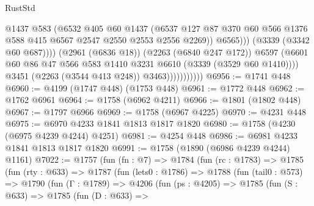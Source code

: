 \begin{lexlean}{RustStd}
\begin{coremodule}
{\begin{coremodule}
{{{{{{{{{{{{{{{                                      @1437
                                      @583
                                      (@6532
                                        @405
                                        @60
                                        @1437
                                        (@6537
                                          @127
                                          @87
                                          @370
                                          @60
                                          @566
                                          @1376
                                          @588
                                          @415
                                          @6567
                                          @2547
                                          @2550
                                          @2553
                                          @2556
                                          @2269))
                                      @6565)))
                                (@3339 (@3342 @60 @687))))
                            (@2961 (@6836 @18))
                            (@2263 (@6840 @247 @172))
                            @6597
                            (@6601
                              @60
                              @86
                              @47
                              @566
                              @583
                              @1410
                              @3231
                              @6610
                              (@3339 (@3529 @60 @1410))))
                          @3451
                          (@2263 (@3544 @413 @248))
                          @3463)))))))))))
@6956 := @1741 @448
@6960 := @4199 (@1747 @448) (@1753 @448)
@6961 := @1772 @448
@6962 := @1762 @6961
@6964 := @1758 (@6962 @4211)
@6966 := @1801 (@1802 @448)
@6967 := @1797 @6966
@6969 := @1758 (@6967 @4225)
@6970 := @4231 @448
@6975 := @6970 @4233 @1841 @1813 @1817 @1820
@6980 := @1758 (@4230 (@6975 @4239 @4244) @4251)
@6981 := @4254 @448
@6986 := @6981 @4233 @1841 @1813 @1817 @1820
@6991 := @1758 (@1890 (@6986 @4239 @4244) @1161)
@7022 := @1757
    (fun (fn : @7) =>
    @1784
      (fun (rc : @1783) =>
      @1785
        (fun (rty : @633) =>
        @1787
          (fun (lets0 : @1786) =>
          @1788
            (fun (tail0 : @573) =>
            @1790
              (fun (Γ : @1789) =>
              @4206
                (fun (ps : @4205) =>
                @1785
                  (fun (S : @633) =>
                  @1785
                    (fun (D : @633) =>
}}}}}}}}}}}}}}}
\end{coremodule}}
\end{coremodule}
\end{lexlean}
